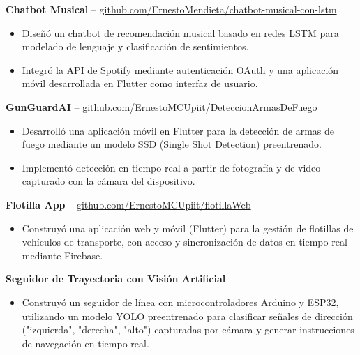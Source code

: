 \documentclass[11pt]{article}
\begin{document}
\vspace{6pt}

\textbf{Chatbot Musical} -- \href{https://github.com/ErnestoMendieta/chatbot-musical-con-lstm}{github.com/ErnestoMendieta/chatbot-musical-con-lstm} \hfill
\begin{itemize}[noitemsep, topsep=2pt, partopsep=0pt, parsep=2pt, leftmargin=0.55cm]
    \item Diseñó un chatbot de recomendación musical basado en redes LSTM para modelado de lenguaje y clasificación de sentimientos.
    \item Integró la API de Spotify mediante autenticación OAuth y una aplicación móvil desarrollada en Flutter como interfaz de usuario.
\end{itemize}

\vspace{6pt}

\textbf{GunGuardAI} -- \href{https://github.com/ErnestoMCUpiit/DeteccionArmasDeFuego/tree/foo}{github.com/ErnestoMCUpiit/DeteccionArmasDeFuego} \hfill
\begin{itemize}[noitemsep, topsep=2pt, partopsep=0pt, parsep=2pt, leftmargin=0.55cm]
    \item Desarrolló una aplicación móvil en Flutter para la detección de armas de fuego mediante un modelo SSD (Single Shot Detection) preentrenado.
    \item Implementó detección en tiempo real a partir de fotografía y de video capturado con la cámara del dispositivo.
\end{itemize}

\vspace{6pt}

\textbf{Flotilla App} -- \href{https://github.com/ErnestoMCUpiit/flotillaWeb}{github.com/ErnestoMCUpiit/flotillaWeb} 
\hfill
\begin{itemize}[noitemsep, topsep=2pt, partopsep=0pt, parsep=2pt, leftmargin=0.55cm]
    \item Construyó una aplicación web y móvil (Flutter) para la gestión de flotillas de vehículos de transporte, con acceso y sincronización de datos en tiempo real mediante Firebase.
\end{itemize}

\vspace{6pt}

\textbf{Seguidor de Trayectoria con Visión Artificial}
\begin{itemize}[noitemsep, topsep=2pt, partopsep=0pt, parsep=2pt, leftmargin=0.55cm]
    \item Construyó un seguidor de línea con microcontroladores Arduino y ESP32, utilizando un modelo YOLO preentrenado para clasificar señales de dirección ("izquierda", "derecha", "alto") capturadas por cámara y generar instrucciones de navegación en tiempo real.
\end{itemize}
\end{document}
